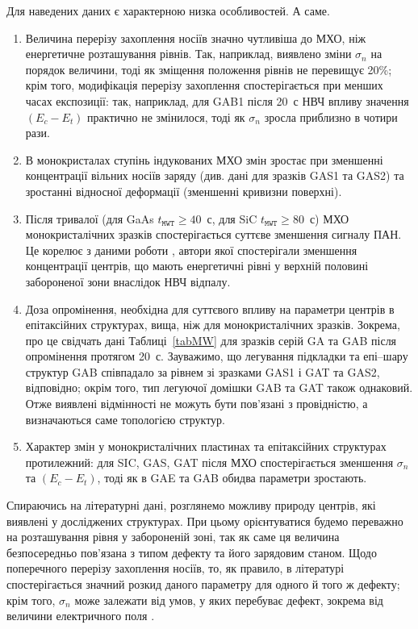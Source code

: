 \documentclass[a4paper,14pt,oneside,openany]{memoir}
\begin{document}
Для наведених даних є характерною низка особливостей.
А саме.
\begin{enumerate}[label=\arabic*),leftmargin=0em,itemindent=1.5em]
\item Величина перерізу захоплення носіїв значно чутливіша до МХО, ніж енергетичне розташування рівнів.
Так, наприклад, виявлено зміни $\sigma_n$ на порядок величини, тоді як зміщення положення рівнів не перевищує 20\%;
крім того, модифікація перерізу захоплення спостерігається при менших часах експозиції: так, наприклад,
для GAB1 після 20~с НВЧ впливу значення $(E_c-E_t)$ практично не змінилося, тоді як $\sigma_n$ зросла приблизно в чотири рази.

\item В монокристалах ступінь індукованих МХО змін зростає при зменшенні концентрації вільних носіїв заряду (див. дані для зразків GAS1 та GAS2) та зростанні відносної деформації (зменшенні кривизни поверхні).

\item Після тривалої (для GaAs $t_\mathtt{MWT}\geq40$~с, для SiC $t_\mathtt{MWT}\geq80$~с) МХО монокристалічних
зразків спостерігається суттєве зменшення сигналу ПАН.
Це корелює з даними роботи \cite{Belyaev1998JTFr}, автори якої спостерігали зменшення концентрації центрів, що
мають енергетичні рівні у верхній половині забороненої зони внаслідок НВЧ відпалу.

\item Доза опромінення, необхідна для суттєвого впливу на параметри центрів в епітаксійних структурах, вища, ніж
для монокристалічних зразків.
Зокрема, про це свідчать дані Таблиці~\ref{tabMW} для зразків серій GA та GAB після опромінення протягом 20~с.
Зауважимо, що легування підкладки та епі--шару структур GAB співпадало за рівнем зі зразками GAS1 і GAT та GAS2, відповідно; окрім того, тип легуючої домішки  GAB та GAT також однаковий.
Отже виявлені відмінності не можуть бути пов'язані з провідністю, а визначаються саме топологією структур.

\item Характер змін у монокристалічних пластинах та епітаксійних структурах протилежний:
для SIC, GAS, GAT після МХО спостерігається зменшення $\sigma_n$ та $(E_c-E_t)$, тоді як в GAE та GAB обидва параметри зростають.
\end{enumerate}

Спираючись на літературні дані, розглянемо можливу природу центрів,
які виявлені у досліджених структурах.
При цьому орієнтуватися будемо переважно на розташування рівня у забороненій зоні, так як саме ця величина безпосередньо пов'язана з типом дефекту та його зарядовим станом.
Щодо поперечного перерізу захоплення носіїв, то, як правило, в літературі спостерігається значний розкид даного параметру для одного й того ж дефекту; крім того, $\sigma_n$ може залежати від умов, у яких перебуває дефект,
зокрема від величини електричного поля \cite{Shishiyanu}.
\end{document}
